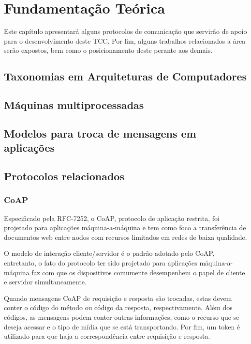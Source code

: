\chapter{\label{chap:chap2} Fundamentação Teórica}

Este capítulo apresentará alguns protocolos de comunicação que servirão de apoio para o desenvolvimento deste TCC. 
Por fim, alguns trabalhos relacionados a área serão expostos, bem como o posicionamento deste perante aos demais.

\section{Taxonomias em Arquiteturas de Computadores}
\section{Máquinas multiprocessadas}
\section{Modelos para troca de mensagens em aplicações}


\section{Protocolos relacionados}

\subsection{CoAP}

Especificado pela RFC-7252, o CoAP, protocolo de aplicação restrita, foi projetado para aplicações máquina-a-máquina
e tem como foco a transferência de documentos web entre nodos com recursos limitados em redes de baixa qualidade\cite{rfc7252}.

O modelo de interação cliente/servidor é o padrão adotado pelo CoAP, entretanto,
o fato do protocolo ter sido projetado para aplicações máquina-a-máquina faz com que os dispositivos comumente desempenhem o papel de cliente e servidor simultaneamente.

Quando mensagens CoAP de requisição e resposta são trocadas, estas devem conter o código do método ou código da resposta, respectivamente.
Além dos códigos, as mensagens podem conter outras informações, como o recurso que se deseja acessar e o tipo de mídia que se está transportando.
Por fim, um token é utilizado para que haja a correspondência entre requisição e resposta.

